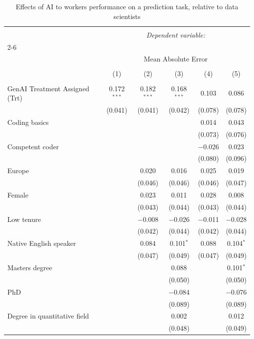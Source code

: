 
\begin{table}[!htbp] \centering 
  \caption{Effects of AI to workers performance on a prediction task, relative to data scientists} 
  \label{tab:robust_ps} 
\small 
\begin{tabular}{@{\extracolsep{-5pt}}lccccc} 
\\[-1.8ex]\hline 
\hline \\[-1.8ex] 
 & \multicolumn{5}{c}{\textit{Dependent variable:}} \\ 
\cline{2-6} 
\\[-1.8ex] & \multicolumn{5}{c}{Mean Absolute Error} \\ 
\\[-1.8ex] & (1) & (2) & (3) & (4) & (5)\\ 
\hline \\[-1.8ex] 
 GenAI Treatment Assigned (Trt) & 0.172$^{***}$ & 0.182$^{***}$ & 0.168$^{***}$ & 0.103 & 0.086 \\ 
  & (0.041) & (0.041) & (0.042) & (0.078) & (0.078) \\ 
  Coding basics &  &  &  & 0.014 & 0.043 \\ 
  &  &  &  & (0.073) & (0.076) \\ 
  Competent coder &  &  &  & $-$0.026 & 0.023 \\ 
  &  &  &  & (0.080) & (0.096) \\ 
  Europe &  & 0.020 & 0.016 & 0.025 & 0.019 \\ 
  &  & (0.046) & (0.046) & (0.046) & (0.047) \\ 
  Female &  & 0.023 & 0.011 & 0.028 & 0.008 \\ 
  &  & (0.043) & (0.044) & (0.043) & (0.044) \\ 
  Low tenure &  & $-$0.008 & $-$0.026 & $-$0.011 & $-$0.028 \\ 
  &  & (0.042) & (0.044) & (0.042) & (0.044) \\ 
  Native English speaker &  & 0.084 & 0.101$^{*}$ & 0.088 & 0.104$^{*}$ \\ 
  &  & (0.047) & (0.049) & (0.047) & (0.049) \\ 
  Masters degree &  &  & 0.088 &  & 0.101$^{*}$ \\ 
  &  &  & (0.050) &  & (0.050) \\ 
  PhD &  &  & $-$0.084 &  & $-$0.076 \\ 
  &  &  & (0.089) &  & (0.089) \\ 
  Degree in quantitative field &  &  & 0.002 &  & 0.012 \\ 
  &  &  & (0.048) &  & (0.049) \\ 

\end{tabular}
\end{table}

